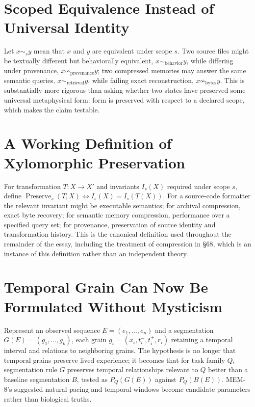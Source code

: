 \documentclass[12pt]{article}
\begin{document}
\section{Scoped Equivalence Instead of Universal Identity}

Let $x\sim_s y$ mean that $x$ and $y$ are equivalent under scope $s$. Two source files might be textually different but behaviorally equivalent, $x\sim_{\mathrm{behavior}}y$, while differing under provenance, $x\not\sim_{\mathrm{provenance}}y$; two compressed memories may answer the same semantic queries, $x\sim_{\mathrm{retrieval}}y$, while failing exact reconstruction, $x\not\sim_{\mathrm{bytes}}y$. This is substantially more rigorous than asking whether two states have preserved some universal metaphysical form: form is preserved with respect to a declared scope, which makes the claim testable.

\section{A Working Definition of Xylomorphic Preservation}

For transformation $T:X\to X'$ and invariants $I_s(X)$ required under scope $s$, define $\operatorname{Preserve}_s(T,X)\iff I_s(X)=I_s(T(X))$. For a source-code formatter the relevant invariant might be executable semantics; for archival compression, exact byte recovery; for semantic memory compression, performance over a specified query set; for provenance, preservation of source identity and transformation history. This is the canonical definition used throughout the remainder of the essay, including the treatment of compression in \S68, which is an instance of this definition rather than an independent theory.

\section{Temporal Grain Can Now Be Formulated Without Mysticism}

Represent an observed sequence $E=(e_1,\dots,e_n)$ and a segmentation $G(E)=(g_1,\dots,g_k)$, each grain $g_i=(x_i,t_i^-,t_i^+,r_i)$ retaining a temporal interval and relations to neighboring grains. The hypothesis is no longer that temporal grains preserve lived experience; it becomes that for task family $Q$, segmentation rule $G$ preserves temporal relationships relevant to $Q$ better than a baseline segmentation $B$, tested as $P_Q(G(E))$ against $P_Q(B(E))$. MEM-8's suggested natural pacing and temporal windows become candidate parameters rather than biological truths.
\end{document}
